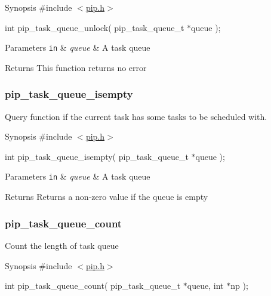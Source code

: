 \begin{DoxyParagraph}{Synopsis}
\#include $<$\hyperlink{pip_8h_source}{pip.\-h}$>$ \par
int pip\-\_\-task\-\_\-queue\-\_\-unlock( pip\-\_\-task\-\_\-queue\-\_\-t $\ast$queue );
\end{DoxyParagraph}

\begin{DoxyParams}[1]{Parameters}
\mbox{\tt in}  & {\em queue} & A task queue\\
\hline
\end{DoxyParams}
\begin{DoxyReturn}{Returns}
This function returns no error 
\end{DoxyReturn}
\hypertarget{pip_task_queue_isempty}{}\subsubsection{pip\-\_\-task\-\_\-queue\-\_\-isempty}\label{pip_task_queue_isempty}
Query function if the current task has some tasks to be scheduled with.

\begin{DoxyParagraph}{Synopsis}
\#include $<$\hyperlink{pip_8h_source}{pip.\-h}$>$ \par
int pip\-\_\-task\-\_\-queue\-\_\-isempty( pip\-\_\-task\-\_\-queue\-\_\-t $\ast$queue );
\end{DoxyParagraph}

\begin{DoxyParams}[1]{Parameters}
\mbox{\tt in}  & {\em queue} & A task queue\\
\hline
\end{DoxyParams}
\begin{DoxyReturn}{Returns}
Returns a non-\/zero value if the queue is empty 
\end{DoxyReturn}
\hypertarget{pip_task_queue_count}{}\subsubsection{pip\-\_\-task\-\_\-queue\-\_\-count}\label{pip_task_queue_count}
Count the length of task queue

\begin{DoxyParagraph}{Synopsis}
\#include $<$\hyperlink{pip_8h_source}{pip.\-h}$>$ \par
int pip\-\_\-task\-\_\-queue\-\_\-count( pip\-\_\-task\-\_\-queue\-\_\-t $\ast$queue, int $\ast$np );
\end{DoxyParagraph}

